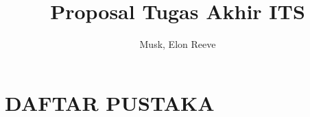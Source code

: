 \documentclass[11pt]{report}
\title{Proposal Tugas Akhir ITS}
\author{Musk, Elon Reeve}
\begin{document}

  
  \newpage

  

  

  

  

  \section{DAFTAR PUSTAKA}
  \renewcommand\bibname{}
  \vspace{-2ex}
  
  
\end{document}
